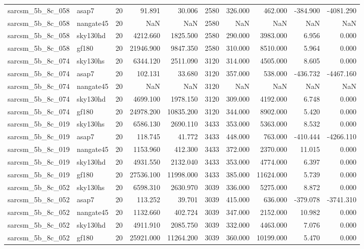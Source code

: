 \documentclass{article}
\begin{document}
\begin{longtable}{llrrrrrrrr}
sarcsm\_5b\_8c\_058 & asap7 & 20 & 91.891 & 30.006 & 2580 & 326.000 & 462.000 & -384.900 & -4081.290 \\
sarcsm\_5b\_8c\_058 & nangate45 & 20 & NaN & NaN & 2580 & NaN & NaN & NaN & NaN \\
sarcsm\_5b\_8c\_058 & sky130hd & 20 & 4212.660 & 1825.500 & 2580 & 290.000 & 3983.000 & 6.956 & 0.000 \\
sarcsm\_5b\_8c\_058 & gf180 & 20 & 21946.900 & 9847.350 & 2580 & 310.000 & 8510.000 & 5.964 & 0.000 \\
sarcsm\_5b\_8c\_074 & sky130hs & 20 & 6344.120 & 2511.090 & 3120 & 314.000 & 4505.000 & 8.605 & 0.000 \\
sarcsm\_5b\_8c\_074 & asap7 & 20 & 102.131 & 33.680 & 3120 & 357.000 & 538.000 & -436.732 & -4467.160 \\
sarcsm\_5b\_8c\_074 & nangate45 & 20 & NaN & NaN & 3120 & NaN & NaN & NaN & NaN \\
sarcsm\_5b\_8c\_074 & sky130hd & 20 & 4699.100 & 1978.150 & 3120 & 309.000 & 4192.000 & 6.748 & 0.000 \\
sarcsm\_5b\_8c\_074 & gf180 & 20 & 24978.200 & 10835.200 & 3120 & 344.000 & 8902.000 & 5.420 & 0.000 \\
sarcsm\_5b\_8c\_019 & sky130hs & 20 & 6586.130 & 2690.110 & 3433 & 353.000 & 5363.000 & 8.532 & 0.000 \\
sarcsm\_5b\_8c\_019 & asap7 & 20 & 118.745 & 41.772 & 3433 & 448.000 & 763.000 & -410.444 & -4266.110 \\
sarcsm\_5b\_8c\_019 & nangate45 & 20 & 1153.960 & 412.300 & 3433 & 372.000 & 2370.000 & 11.015 & 0.000 \\
sarcsm\_5b\_8c\_019 & sky130hd & 20 & 4931.550 & 2132.040 & 3433 & 353.000 & 4774.000 & 6.397 & 0.000 \\
sarcsm\_5b\_8c\_019 & gf180 & 20 & 27536.100 & 11998.000 & 3433 & 385.000 & 11624.000 & 5.739 & 0.000 \\
sarcsm\_5b\_8c\_052 & sky130hs & 20 & 6598.310 & 2630.970 & 3039 & 336.000 & 5275.000 & 8.872 & 0.000 \\
sarcsm\_5b\_8c\_052 & asap7 & 20 & 113.252 & 39.701 & 3039 & 415.000 & 636.000 & -379.078 & -3741.310 \\
sarcsm\_5b\_8c\_052 & nangate45 & 20 & 1132.660 & 402.724 & 3039 & 347.000 & 2152.000 & 10.982 & 0.000 \\
sarcsm\_5b\_8c\_052 & sky130hd & 20 & 4911.910 & 2085.750 & 3039 & 332.000 & 4463.000 & 7.076 & 0.000 \\
sarcsm\_5b\_8c\_052 & gf180 & 20 & 25921.000 & 11264.200 & 3039 & 360.000 & 10199.000 & 5.470 & 0.000 \\

\end{longtable}
\end{document}
